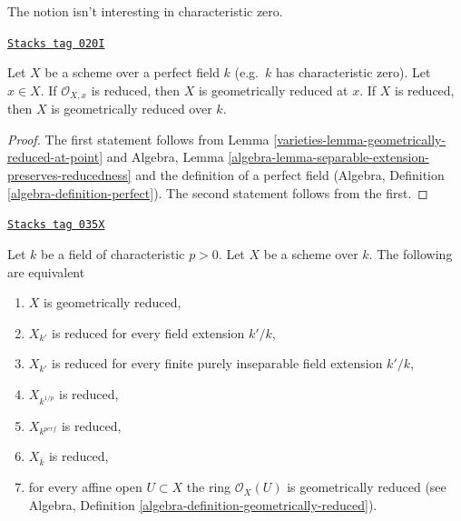 The notion isn't interesting in characteristic zero.

\begin{lemma}
\label{varieties-lemma-perfect-reduced}
\href{https://stacks.math.columbia.edu/tag/020I}{\texttt{Stacks tag 020I}}

Let $X$ be a scheme over a perfect field $k$ (e.g.\ $k$ has
characteristic zero). Let $x \in X$. If $\mathcal{O}_{X, x}$ is
reduced, then $X$ is geometrically reduced at $x$.
If $X$ is reduced, then $X$ is geometrically reduced over $k$.
\end{lemma}

\begin{proof}

The first statement follows from
Lemma \ref{varieties-lemma-geometrically-reduced-at-point} and
Algebra, Lemma \ref{algebra-lemma-separable-extension-preserves-reducedness}
and the definition of a perfect field
(Algebra, Definition \ref{algebra-definition-perfect}).
The second statement follows from the first.
\end{proof}

\begin{lemma}
\label{varieties-lemma-geometrically-reduced}
\href{https://stacks.math.columbia.edu/tag/035X}{\texttt{Stacks tag 035X}}

Let $k$ be a field of characteristic $p > 0$. Let $X$ be a scheme over $k$.
The following are equivalent
\begin{enumerate}
\item $X$ is geometrically reduced,
\item $X_{k'}$ is reduced for every field extension $k'/k$,
\item $X_{k'}$ is reduced for every finite purely inseparable field extension
$k'/k$,
\item $X_{k^{1/p}}$ is reduced,
\item $X_{k^{perf}}$ is reduced,
\item $X_{\bar k}$ is reduced,
\item for every affine open $U \subset X$ the ring $\mathcal{O}_X(U)$
is geometrically reduced (see
Algebra, Definition \ref{algebra-definition-geometrically-reduced}).
\end{enumerate}
\end{lemma}

